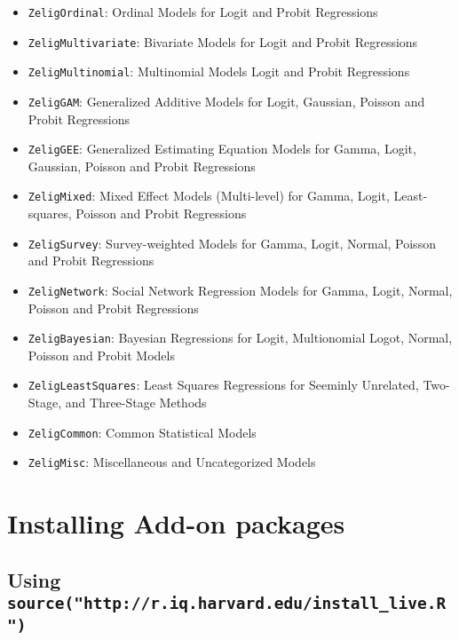 \begin{itemize}
  \item {\tt ZeligOrdinal}: Ordinal Models for Logit and Probit Regressions

  \item {\tt ZeligMultivariate}: Bivariate Models for Logit and Probit Regressions

  \item {\tt ZeligMultinomial}: Multinomial Models Logit and Probit Regressions

  \item {\tt ZeligGAM}: Generalized Additive Models for Logit, Gaussian, Poisson and Probit Regressions

  \item {\tt ZeligGEE}: Generalized Estimating Equation Models for Gamma, Logit, Gaussian, Poisson and Probit Regressions

  \item {\tt ZeligMixed}: Mixed Effect Models (Multi-level) for Gamma, Logit, Least-squares, Poisson and Probit Regressions

  \item {\tt ZeligSurvey}: Survey-weighted Models for Gamma, Logit, Normal, Poisson and Probit Regressions

  \item {\tt ZeligNetwork}: Social Network Regression Models for Gamma, Logit, Normal, Poisson and Probit Regressions

  \item {\tt ZeligBayesian}: Bayesian Regressions for Logit, Multionomial Logot, Normal, Poisson and Probit Models

  \item {\tt ZeligLeastSquares}: Least Squares Regressions for Seeminly Unrelated, Two-Stage, and Three-Stage Methods

  \item {\tt ZeligCommon}: Common Statistical Models

  \item {\tt ZeligMisc}: Miscellaneous and Uncategorized Models

\end{itemize}

\section{Installing Add-on packages}
\label{sec:install-add-ons}

\subsection{Using {\tt source("http://r.iq.harvard.edu/install\_live.R")}}

